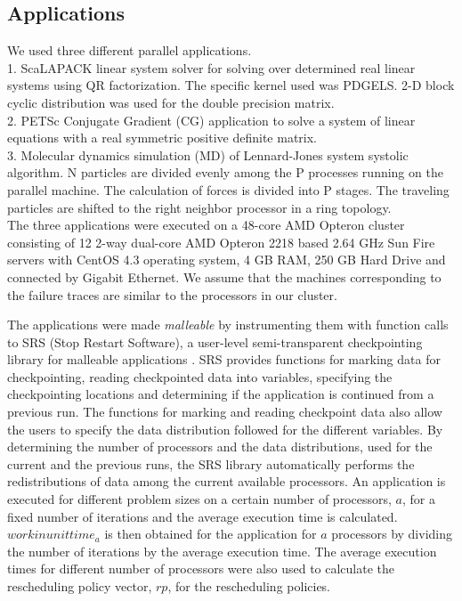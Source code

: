 \documentclass[conference,10pt]{IEEEtran}
\begin{document}
\subsection{Applications}

We used three different parallel applications. \\
1. ScaLAPACK\cite{scalapack-guide} linear system solver for solving
  over determined real linear systems using QR factorization. The
  specific kernel used was PDGELS. 2-D block cyclic distribution was
  used for the double precision matrix. \\
2. PETSc\cite{petsc-web} Conjugate Gradient (CG) application to solve a system of
  linear equations with a real symmetric positive definite matrix. \\
3. Molecular dynamics simulation (MD) of Lennard-Jones system
  systolic algorithm. N particles are divided evenly among the P
  processes running on the parallel machine. The calculation of forces
  is divided into P stages. The traveling particles are shifted to the
  right neighbor processor in a ring topology. \\
The three applications were executed on a 48-core AMD Opteron
cluster consisting of 12 2-way dual-core AMD Opteron 2218 based 2.64
GHz Sun Fire servers with CentOS 4.3 operating system, 4 GB RAM, 250
GB Hard Drive and connected by Gigabit Ethernet. We assume that the
machines corresponding to the failure traces are similar to the
processors in our cluster. 

The applications were made {\em malleable} by instrumenting them with
function calls to SRS (Stop Restart Software), a user-level
semi-transparent checkpointing library for malleable applications
\cite{vadhiyar-srs-ppl2003}. SRS provides functions for marking data
for checkpointing, reading checkpointed data into variables,
specifying the checkpointing locations and determining if the
application is continued from a previous run. The functions for
marking and reading checkpoint data also allow the users to specify
the data distribution followed for the different variables. By
determining the number of processors and the data distributions, used
for the current and the previous runs, the SRS library automatically
performs the redistributions of data among the current available
processors.
An application is executed for different problem sizes on a certain
number of processors, $a$, for a fixed number of iterations and the
average execution time is calculated. $workinunittime_a$ is then
obtained for the application for $a$ processors by dividing the number
of iterations by the average execution time. The average execution
times for different number of processors were also used to calculate
the rescheduling policy vector, $rp$, for the rescheduling
policies.
\end{document}

